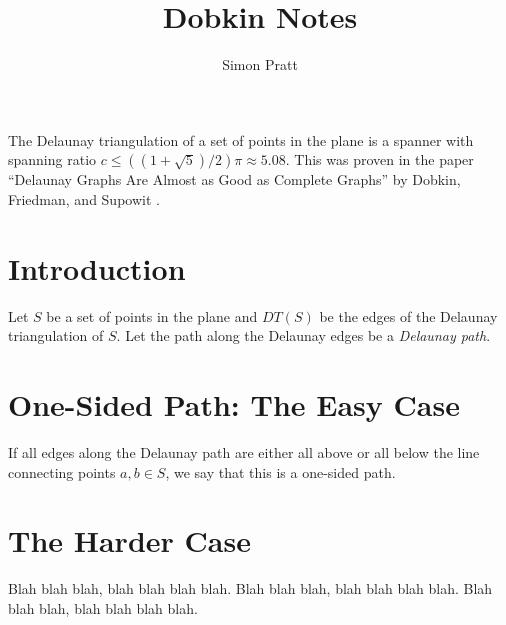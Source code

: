 \documentclass{tufte-handout}
\title{Dobkin Notes}
\author{Simon Pratt}
\begin{document}
\maketitle

\vspace{5mm}


The Delaunay triangulation of a set of points in the plane is a
spanner with spanning ratio $c \le ((1 + \sqrt{5})/2)\pi \approx
5.08$.  This was proven in the paper ``Delaunay Graphs Are Almost as
Good as Complete Graphs'' by Dobkin, Friedman, and Supowit
\cite{Dobkin:1990}.

\section{Introduction}

Let $S$ be a set of points in the plane and $DT(S)$ be the edges of
the Delaunay triangulation of $S$.  Let the path along the Delaunay
edges be a \emph{Delaunay path}.

\section{One-Sided Path: The Easy Case}

If all edges along the Delaunay path are either all above or all below
the line connecting points $a,b \in S$, we say that this is a
one-sided path.

\section{The Harder Case}

Blah blah blah, blah blah blah blah.  Blah blah blah, blah blah blah
blah.  Blah blah blah, blah blah blah blah.


\end{document}
